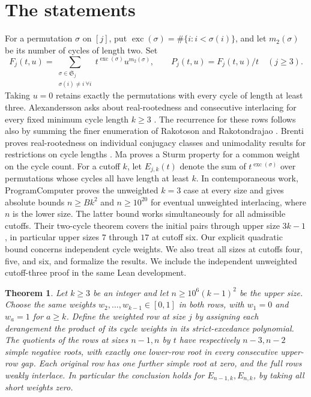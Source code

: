 \documentclass[11pt]{article}
\newtheorem{theorem}{Theorem}
\newcommand{\exc}{\operatorname{exc}}
\begin{document}
\section{The statements}
For a permutation \(\sigma\) on \([j]\), put \(\exc(\sigma)=\#\{i:i<\sigma(i)\}\), and let \(m_2(\sigma)\) be its number of cycles of length two. Set
\[
 F_j(t,u)=\sum_{\substack{\sigma\in\mathfrak S_j\\ \sigma(i)\ne i\ \forall i}}
       t^{\exc(\sigma)}u^{m_2(\sigma)},\qquad
 P_j(t,u)=F_j(t,u)/t\quad(j\ge3).
\]
Taking \(u=0\) retains exactly the permutations with every cycle of length at least three. Alexandersson asks about real-rootedness and consecutive interlacing for every fixed minimum cycle length \(k\ge3\) \cite{alex}. The recurrence for these rows follows also by summing the finer enumeration of Rakotoson and Rakotondrajao \cite[Theorem~30]{rr}. Brenti proves real-rootedness on individual conjugacy classes and unimodality results for restrictions on cycle lengths \cite[Theorems~3.2--3.4]{brenti}. Ma \cite[Theorem~3.5]{ma} proves a Sturm property for a common weight on the cycle count.
For a cutoff \(k\), let \(E_{j,k}(t)\) denote the sum of \(t^{\exc(\sigma)}\) over permutations whose cycles all have length at least \(k\).
In contemporaneous work, ProgramComputer \cite{programcomputer,programcomputer3} proves the unweighted \(k=3\) case at every size and gives absolute bounds \(n\ge Bk^2\) and \(n\ge10^{20}\) for eventual unweighted interlacing, where \(n\) is the lower size. The latter bound works simultaneously for all admissible cutoffs. Their two-cycle theorem \cite{programcomputer2} covers the initial pairs through upper size \(3k-1\), in particular upper sizes \(7\) through \(17\) at cutoff six. Our explicit quadratic bound concerns independent cycle weights. We also treat all sizes at cutoffs four, five, and six, and formalize the results. We include the independent unweighted cutoff-three proof in the same Lean development.
\begin{theorem}\label{general}
Let \(k\ge3\) be an integer and let \(n\ge10^6(k-1)^2\) be the upper size. Choose the same weights \(w_2,\ldots,w_{k-1}\in[0,1]\) in both rows, with \(w_1=0\) and \(w_a=1\) for \(a\ge k\). Define the weighted row at size \(j\) by assigning each derangement the product of its cycle weights in its strict-excedance polynomial. The quotients of the rows at sizes \(n-1,n\) by \(t\) have respectively \(n-3,n-2\) simple negative roots, with exactly one lower-row root in every consecutive upper-row gap. Each original row has one further simple root at zero, and the full rows weakly interlace. In particular the conclusion holds for \(E_{n-1,k},E_{n,k}\), by taking all short weights zero.
\end{theorem}
\end{document}
